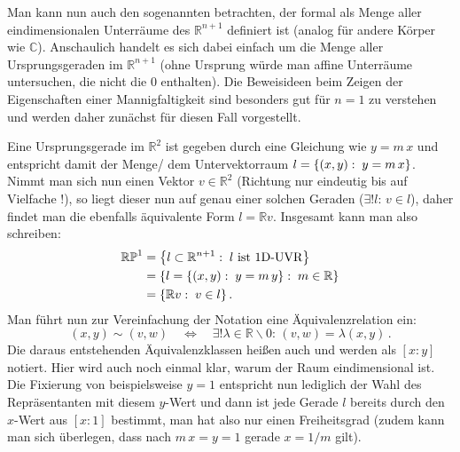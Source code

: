 \documentclass[../H_Analysis_main.tex]{subfiles}
\begin{document}
\begin{bsp}
Man kann nun auch den sogenannten  betrachten, der formal als Menge aller eindimensionalen Unterräume des $\mathbb{R}^{n + 1}$ definiert ist (analog für andere Körper wie $\mathbb{C}$). Anschaulich handelt es sich dabei einfach um die Menge aller Ursprungsgeraden im $\mathbb{R}^{n + 1}$ (ohne Ursprung würde man affine Unterräume untersuchen, die nicht die 0 enthalten). Die Beweisideen beim Zeigen der Eigenschaften einer Mannigfaltigkeit sind besonders gut für $n = 1$ zu verstehen und werden daher zunächst für diesen Fall vorgestellt.

Eine Ursprungsgerade im $\mathbb{R}^2$ ist gegeben durch eine Gleichung wie $y = m \, x$ und entspricht damit der Menge/ dem Untervektorraum $l = \qty{(x, y): \; y = m \, x}$. Nimmt man sich nun einen Vektor $v \in \mathbb{R}^2$ (Richtung nur eindeutig bis auf Vielfache !), so liegt dieser nun auf genau einer solchen Geraden ($\exists! l: \, v \in l$), daher findet man die ebenfalls äquivalente Form $l = \mathbb{R} v$. Insgesamt kann man also schreiben:
\begin{equation}
\begin{split}
\mathbb{RP}^1 &= \qty{l \subset \mathbb{R}^{n + 1}: \; l \text{ ist 1D-UVR}}
\\
&= \qty{l = \qty{(x, y): \; y = m \, y}: \; m \in \mathbb{R}}
\\
&= \qty{\mathbb{R} v: \; v \in l} \, .
\end{split}
\end{equation}
Man führt nun zur Vereinfachung der Notation eine Äquivalenzrelation ein:
\begin{equation}
(x, y) \sim (v, w) \quad \Leftrightarrow \quad \exists! \lambda \in \mathbb{R} \backslash \qty{0}: \, (v, w) = \lambda (x, y) \, .
\end{equation}
Die daraus entstehenden Äquivalenzklassen heißen auch  und werden als $[x:y]$ notiert. Hier wird auch noch einmal klar, warum der Raum eindimensional ist. Die Fixierung von beispielsweise $y = 1$ entspricht nun lediglich der Wahl des Repräsentanten mit diesem $y$-Wert und dann ist jede Gerade $l$ bereits durch den $x$-Wert aus $[x:1]$ bestimmt, man hat also nur einen Freiheitsgrad (zudem kann man sich überlegen, dass nach $m \, x = y = 1$ gerade $x = 1/m$ gilt).


\end{bsp}
\end{document}
